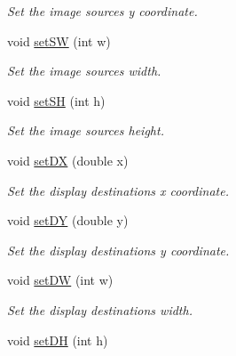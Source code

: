 \begin{DoxyCompactItemize}
\begin{DoxyCompactList}\small\item\em Set the image sources y coordinate. \end{DoxyCompactList}\item 
void \hyperlink{classObject_a90577eaa8ea00ed7d01bf6829719322b}{set\+SW} (int w)\hypertarget{classObject_a90577eaa8ea00ed7d01bf6829719322b}{}\label{classObject_a90577eaa8ea00ed7d01bf6829719322b}

\begin{DoxyCompactList}\small\item\em Set the image sources width. \end{DoxyCompactList}\item 
void \hyperlink{classObject_a91800313b280d6812e2b374608172d7f}{set\+SH} (int h)\hypertarget{classObject_a91800313b280d6812e2b374608172d7f}{}\label{classObject_a91800313b280d6812e2b374608172d7f}

\begin{DoxyCompactList}\small\item\em Set the image sources height. \end{DoxyCompactList}\item 
void \hyperlink{classObject_a7c068c88758bf95a147b123ce52026a0}{set\+DX} (double x)\hypertarget{classObject_a7c068c88758bf95a147b123ce52026a0}{}\label{classObject_a7c068c88758bf95a147b123ce52026a0}

\begin{DoxyCompactList}\small\item\em Set the display destinations x coordinate. \end{DoxyCompactList}\item 
void \hyperlink{classObject_a9e7d9c484f3cdeac79edf6b1b13942d0}{set\+DY} (double y)\hypertarget{classObject_a9e7d9c484f3cdeac79edf6b1b13942d0}{}\label{classObject_a9e7d9c484f3cdeac79edf6b1b13942d0}

\begin{DoxyCompactList}\small\item\em Set the display destinations y coordinate. \end{DoxyCompactList}\item 
void \hyperlink{classObject_a7c9fcca4e1bab0097443557d02eaa498}{set\+DW} (int w)\hypertarget{classObject_a7c9fcca4e1bab0097443557d02eaa498}{}\label{classObject_a7c9fcca4e1bab0097443557d02eaa498}

\begin{DoxyCompactList}\small\item\em Set the display destinations width. \end{DoxyCompactList}\item 
void \hyperlink{classObject_a2c7a299d4311e4b2515022383f90b82a}{set\+DH} (int h)\hypertarget{classObject_a2c7a299d4311e4b2515022383f90b82a}{}\label{classObject_a2c7a299d4311e4b2515022383f90b82a}


\end{DoxyCompactItemize}
